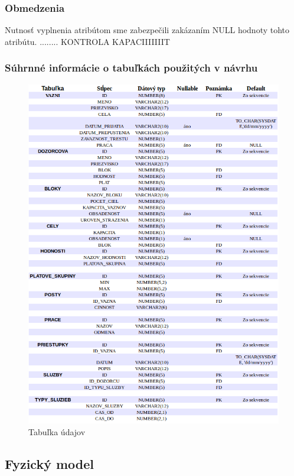 \documentclass[slovak, 12pt, Times New Roman]{article}
\begin{document}
			\subsubsection{Obmedzenia}
				Nutnosť vyplnenia atribútom sme zabezpečili zakázaním NULL hodnoty tohto atribútu. 
				........ KONTROLA KAPACIIIIIIIT
			\clearpage
			\subsubsection{Súhrnné informácie o tabuľkách použitých v návrhu}
				\begin{figure}[!htb]
				\centering
				\includegraphics[scale=0.6]{suhrnneInfo.png}
				\caption{Tabuľka údajov}
				\label{fig:Reinforcement}
			\end{figure}
			\clearpage
		\subsection{Fyzický model}
		\clearpage
\end{document}
